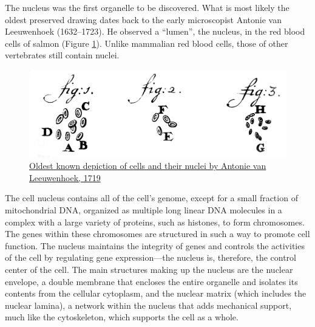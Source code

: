 The nucleus was the first organelle to be discovered. What is most likely the oldest preserved drawing dates back to the early microscopist Antonie van Leeuwenhoek (1632--1723). He observed a ``lumen'', the nucleus, in the red blood cells of salmon (Figure \ref{fig:leeuvenhookcells}). Unlike mammalian red blood cells, those of other vertebrates still contain nuclei.



\begin{figure}

{\centering \includegraphics[width=0.7\linewidth]{./figures/cells/Leeuwenhoek1719RedBloodCells} 

}

\caption{\href{https://commons.wikimedia.org/wiki/File:Leeuwenhoek1719RedBloodCells.jpg}{Oldest known depiction of cells and their nuclei by Antonie van Leeuwenhoek, 1719}}\label{fig:leeuvenhookcells}
\end{figure}

The cell nucleus contains all of the cell's genome, except for a small fraction of mitochondrial DNA, organized as multiple long linear DNA molecules in a complex with a large variety of proteins, such as histones, to form chromosomes. The genes within these chromosomes are structured in such a way to promote cell function. The nucleus maintains the integrity of genes and controls the activities of the cell by regulating gene expression---the nucleus is, therefore, the control center of the cell. The main structures making up the nucleus are the nuclear envelope, a double membrane that encloses the entire organelle and isolates its contents from the cellular cytoplasm, and the nuclear matrix (which includes the nuclear lamina), a network within the nucleus that adds mechanical support, much like the cytoskeleton, which supports the cell as a whole.



